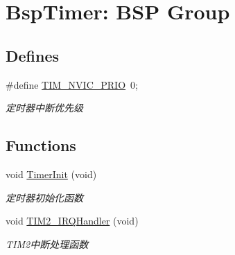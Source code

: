 \hypertarget{group___t_i_m_e_r}{\section{\-Bsp\-Timer\-: \-B\-S\-P \-Group}
\label{group___t_i_m_e_r}
}
\subsection*{\-Defines}
\begin{DoxyCompactItemize}
\item 
\hypertarget{group___t_i_m_e_r_gaad1f42280cb1e57ac9a12ceb897ab7f5}{\#define \hyperlink{group___t_i_m_e_r_gaad1f42280cb1e57ac9a12ceb897ab7f5}{\-T\-I\-M\-\_\-\-N\-V\-I\-C\-\_\-\-P\-R\-I\-O}~0;}\label{group___t_i_m_e_r_gaad1f42280cb1e57ac9a12ceb897ab7f5}

\begin{DoxyCompactList}\small\item\em 定时器中断优先级 \end{DoxyCompactList}\end{DoxyCompactItemize}
\subsection*{\-Functions}
\begin{DoxyCompactItemize}
\item 
void \hyperlink{group___t_i_m_e_r_ga5499adb17edb227885abaccd47631df4}{\-Timer\-Init} (void)
\begin{DoxyCompactList}\small\item\em 定时器初始化函数 \end{DoxyCompactList}\item 
void \hyperlink{group___t_i_m_e_r_ga38ad4725462bdc5e86c4ead4f04b9fc2}{\-T\-I\-M2\-\_\-\-I\-R\-Q\-Handler} (void)
\begin{DoxyCompactList}\small\item\em \-T\-I\-M2中断处理函数 \end{DoxyCompactList}\end{DoxyCompactItemize}
